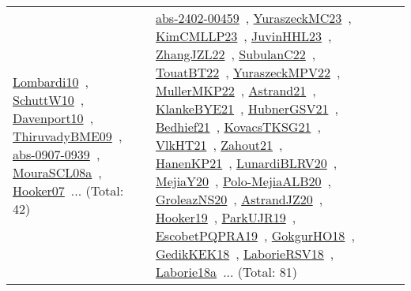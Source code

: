 {\begin{longtable}{lp{3cm}>{\raggedright\arraybackslash}p{6cm}>{\raggedright\arraybackslash}p{6cm}>{\raggedright\arraybackslash}p{8cm}}
\href{works/Lombardi10.pdf}{Lombardi10}~\cite{Lombardi10}, \href{works/SchuttW10.pdf}{SchuttW10}~\cite{SchuttW10}, \href{works/Davenport10.pdf}{Davenport10}~\cite{Davenport10}, \href{works/ThiruvadyBME09.pdf}{ThiruvadyBME09}~\cite{ThiruvadyBME09}, \href{works/abs-0907-0939.pdf}{abs-0907-0939}~\cite{abs-0907-0939}, \href{works/MouraSCL08a.pdf}{MouraSCL08a}~\cite{MouraSCL08a}, \href{works/Hooker07.pdf}{Hooker07}~\cite{Hooker07}... (Total: 42) & \href{works/abs-2402-00459.pdf}{abs-2402-00459}~\cite{abs-2402-00459}, \href{works/YuraszeckMC23.pdf}{YuraszeckMC23}~\cite{YuraszeckMC23}, \href{works/KimCMLLP23.pdf}{KimCMLLP23}~\cite{KimCMLLP23}, \href{works/JuvinHHL23.pdf}{JuvinHHL23}~\cite{JuvinHHL23}, \href{works/ZhangJZL22.pdf}{ZhangJZL22}~\cite{ZhangJZL22}, \href{works/SubulanC22.pdf}{SubulanC22}~\cite{SubulanC22}, \href{works/TouatBT22.pdf}{TouatBT22}~\cite{TouatBT22}, \href{works/YuraszeckMPV22.pdf}{YuraszeckMPV22}~\cite{YuraszeckMPV22}, \href{works/MullerMKP22.pdf}{MullerMKP22}~\cite{MullerMKP22}, \href{works/Astrand21.pdf}{Astrand21}~\cite{Astrand21}, \href{works/KlankeBYE21.pdf}{KlankeBYE21}~\cite{KlankeBYE21}, \href{works/HubnerGSV21.pdf}{HubnerGSV21}~\cite{HubnerGSV21}, \href{works/Bedhief21.pdf}{Bedhief21}~\cite{Bedhief21}, \href{works/KovacsTKSG21.pdf}{KovacsTKSG21}~\cite{KovacsTKSG21}, \href{works/VlkHT21.pdf}{VlkHT21}~\cite{VlkHT21}, \href{works/Zahout21.pdf}{Zahout21}~\cite{Zahout21}, \href{works/HanenKP21.pdf}{HanenKP21}~\cite{HanenKP21}, \href{works/LunardiBLRV20.pdf}{LunardiBLRV20}~\cite{LunardiBLRV20}, \href{works/MejiaY20.pdf}{MejiaY20}~\cite{MejiaY20}, \href{works/Polo-MejiaALB20.pdf}{Polo-MejiaALB20}~\cite{Polo-MejiaALB20}, \href{works/GroleazNS20.pdf}{GroleazNS20}~\cite{GroleazNS20}, \href{works/AstrandJZ20.pdf}{AstrandJZ20}~\cite{AstrandJZ20}, \href{works/Hooker19.pdf}{Hooker19}~\cite{Hooker19}, \href{works/ParkUJR19.pdf}{ParkUJR19}~\cite{ParkUJR19}, \href{works/EscobetPQPRA19.pdf}{EscobetPQPRA19}~\cite{EscobetPQPRA19}, \href{works/GokgurHO18.pdf}{GokgurHO18}~\cite{GokgurHO18}, \href{works/GedikKEK18.pdf}{GedikKEK18}~\cite{GedikKEK18}, \href{works/LaborieRSV18.pdf}{LaborieRSV18}~\cite{LaborieRSV18}, \href{works/Laborie18a.pdf}{Laborie18a}~\cite{Laborie18a}... (Total: 81)\\

\end{longtable}}

